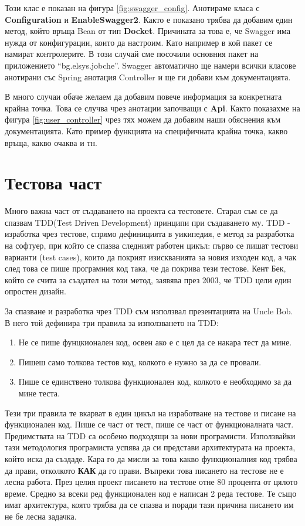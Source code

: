         Този клас е показан на фигура \ref{fig:swagger_config}. Анотираме класа с \textbf{Configuration} и \textbf{EnableSwagger2}. Както е показано трябва да добавим един метод, който връща Bean от тип \textbf{Docket}. Причината за това е, че Swagger има нужда от конфигурации, които да настроим. Като например в кой пакет се намират контролерите. В този случай сме посочили основния пакет на приложението ``bg.elsys.jobche''. Swagger автоматично ще намери всички класове анотирани със Spring анотация Controller и ще ги добави към документацията. 
        
        В много случаи обаче желаем да добавим повече информация за конкретната крайна точка. Това се случва чрез анотации започващи с \textbf{Api}. Както показахме на фигура \ref{fig:user_controller} чрез тях можем да добавим наши обяснения към документацията. Като пример функцията на специфичната крайна точка, какво връща, какво очаква и тн.
    
\section{Тестова част}

    Много важна част от създаването на проекта са тестовете. Старал съм се да спазвам TDD(Test Driven Development) принципи при създаването му. TDD - изработка чрез тестове, спрямо дефиницията в уикипедия, е метод за разработка на софтуер, при който се спазва следният работен цикъл: първо се пишат тестови варианти (test cases), които да покрият изискванията за новия изходен код, а чак след това се пише програмния код така, че да покрива тези тестове. Кент Бек, който се счита за създател на този метод, заявява през 2003, че TDD цели един опростен дизайн\parencite{TDD}. 
    
    За спазване и разработка чрез TDD съм използвал презентацията на Uncle Bob\parencite{KotlinTDD}.
    В него той дефинира три правила за използването на TDD:
    \begin{enumerate}
        \item Не се пише фунцкионален код, освен ако е с цел да се накара тест да мине.
        \item Пишеш само толкова тестов код, колкото е нужно за да се провали.
        \item Пише се единствено толкова функционален код, колкото е необходимо за да мине теста.
    \end{enumerate}
    
    Тези три правила те вкарват в един цикъл на изработване на тестове и писане на функционален код. Пише се част от тест, пише се част от функционалната част. Предимствата на TDD са особено подходящи за нови програмисти. Използвайки тази методология програмиста успява да си представи архитектурата на проекта, който иска да създаде. Кара го да мисли за това какво функционалния код трябва да прави, отколкото \textbf{КАК} да го прави. Въпреки това писането на тестове не е лесна работа. През целия проект писането на тестове отне 80 процента от цялото време. Средно за всеки ред функционален код е написан 2 реда тестове. Те също имат архитектура, която трябва да се спазва и поради тази причина писането им не бе лесна задачка.
    
